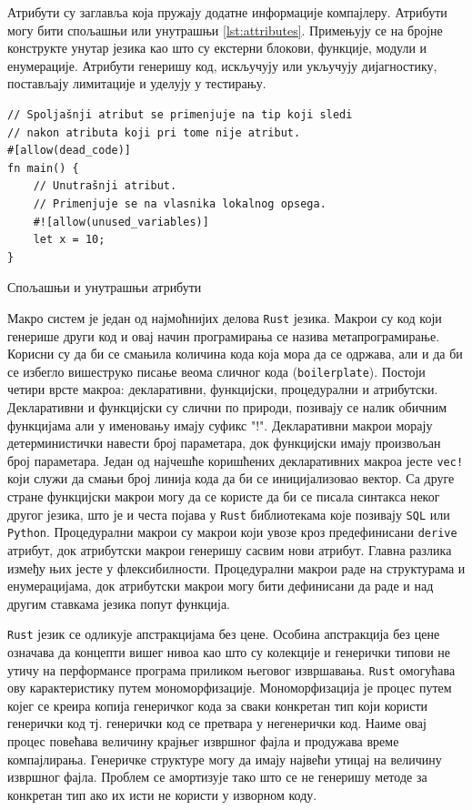 Атрибути су заглавља која пружају додатне информације компајлеру. Атрибути могу бити спољашњи или 
унутрашњи \ref{lst:attributes}. Примењују се на бројне конструкте унутар језика као што су екстерни блокови,
функције, модули и енумерације. Атрибути генеришу код, искључују или укључују дијагностику, 
постављају лимитације и уделују у тестирању. 

\begin{listing}[H]
\begin{verbatim}
// Spoljašnji atribut se primenjuje na tip koji sledi 
// nakon atributa koji pri tome nije atribut.
#[allow(dead_code)] 
fn main() {
    // Unutrašnji atribut.
    // Primenjuje se na vlasnika lokalnog opsega. 
    #![allow(unused_variables)]
    let x = 10;  
}
\end{verbatim}
\caption{Спољашњи и унутрашњи атрибути}
\label{lst:attributes}
\end{listing}

Макро систем је један од најмоћнијих делова \verb|Rust| језика. Макрои су код који генерише други код и овај 
начин програмирања се назива метапрограмирање. 
Корисни су да би се смањила количина кода која мора да се одржава, али и да би се избегло вишеструко писање 
веома сличног кода (\verb|boilerplate|). Постоји четири врсте макроа: декларативни, функцијски, процедурални и атрибутски. 
Декларативни и функцијски су слични по природи, позивају се налик обичним функцијама али у именовању имају суфикс "!".
Декларативни макрои морају детерминистички навести број параметара, док функцијски имају произвољан број параметара.
Један од најчешће коришћених декларативних макроа јесте \verb|vec!| који служи да смањи број линија кода да би се 
иницијализовао вектор. Са друге стране функцијски макрои могу да се користе да би се писала синтакса неког другог језика, 
што је и честа појава у \verb|Rust| библиотекама које позивају \verb|SQL| или \verb|Python|.
Процедурални макрои су макрои који увозе кроз предефинисани \verb|derive| атрибут, док атрибутски макрои генеришу сасвим 
нови атрибут. Главна разлика између њих јесте у флексибилности. Процедурални макрои раде на структурама и енумерацијама,
док атрибутски макрои могу бити дефинисани да раде и над другим ставкама језика попут функција.

\verb|Rust| језик се одликује апстракцијама без цене. Особина апстракција без цене означава да концепти 
вишег нивоа као што су колекције и генерички типови не утичу на перформансе програма приликом његовог извршавања.
\verb|Rust| омогућава ову карактеристику путем мономорфизације. Мономорфизација је процес путем којег се креира 
копија генеричког кода за сваки конкретан тип који користи генерички код тј. генерички код се претвара у 
негенерички код. Наиме овај процес повећава величину крајњег извршног фајла и продужава време компајлирања.
Генеричке структуре могу да имају највећи утицај на величину извршног фајла. Проблем се амортизује 
тако што се не генеришу методе за конкретан тип ако их исти не користи у изворном коду.


